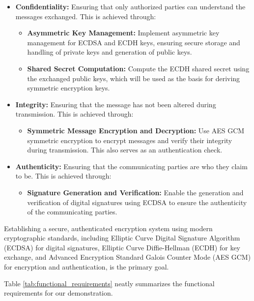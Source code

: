 \begin{itemize}
    \item \textbf{Confidentiality:} Ensuring that only authorized parties can understand the messages exchanged. This is achieved through:
    \begin{itemize}
        \item \textbf{Asymmetric Key Management:} Implement asymmetric key  management for ECDSA and ECDH keys, ensuring secure storage and handling of private keys and generation of public keys.
        \item \textbf{Shared Secret Computation:} Compute the ECDH shared secret using the exchanged public keys, which will be used as the basis for deriving symmetric encryption keys.
    \end{itemize}
    
    \item \textbf{Integrity:} Ensuring that the message has not been altered during transmission. This is achieved through:
    \begin{itemize}
       \item \textbf{Symmetric Message Encryption and Decryption:} Use AES GCM symmetric encryption to encrypt messages and verify their integrity during transmission. This also serves as an authentication check.
    \end{itemize}
    
    \item \textbf{Authenticity:} Ensuring that the communicating parties are who they claim to be. This is achieved through:
    \begin{itemize}
        \item \textbf{Signature Generation and Verification:} Enable the generation and verification of digital signatures using ECDSA to ensure the authenticity of the communicating parties.
    \end{itemize}
\end{itemize}

Establishing a secure, authenticated encryption system using modern cryptographic standards, including Elliptic Curve Digital Signature Algorithm (ECDSA) for digital signatures, Elliptic Curve Diffie-Hellman (ECDH) for key exchange, and Advanced Encryption Standard Galois Counter Mode (AES GCM) for encryption and authentication, is the primary goal.

Table \ref{tab:functional_requirements} neatly summarizes the functional requirements for our demonstration.

\setlength{\tabcolsep}{10pt} %
\renewcommand{\arraystretch}{1.5} %

